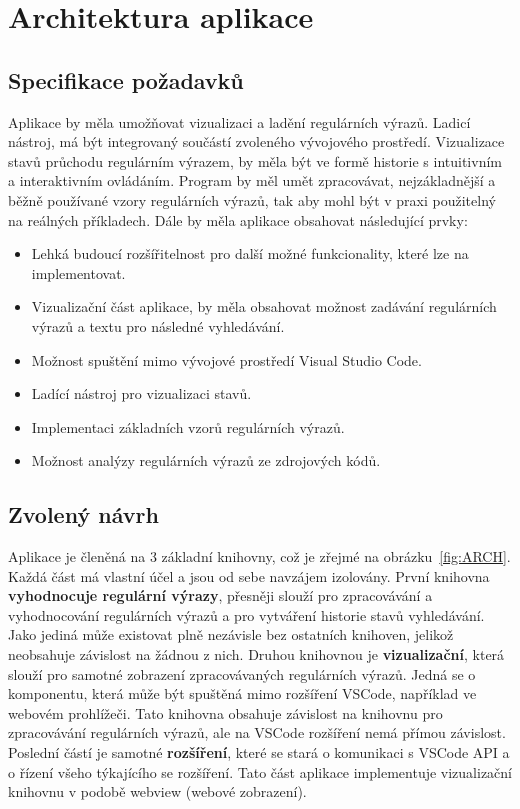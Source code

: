 \chapter{Architektura aplikace}\label{sec:ApplicationTechnology}

\section{Specifikace požadavků}

Aplikace by měla umožňovat vizualizaci a ladění regulárních výrazů.
Ladicí nástroj, má být integrovaný součástí zvoleného vývojového prostředí.
Vizualizace stavů průchodu regulárním výrazem, by měla být ve formě historie s intuitivním a interaktivním ovládáním.
Program by měl umět zpracovávat, nejzákladnější a běžně používané vzory regulárních výrazů, tak aby mohl být v praxi použitelný na reálných příkladech.
Dále by měla aplikace obsahovat následující prvky:
\begin{itemize}
	\item Lehká budoucí rozšířitelnost pro další možné funkcionality, které lze na implementovat.
	\item Vizualizační část aplikace, by měla obsahovat možnost zadávání regulárních výrazů a textu pro následné vyhledávání.
	\item Možnost spuštění mimo vývojové prostředí Visual Studio Code.
	\item Ladící nástroj pro vizualizaci stavů.
	\item Implementaci základních vzorů regulárních výrazů.
	\item Možnost analýzy regulárních výrazů ze zdrojových kódů.
\end{itemize}

\section{Zvolený návrh}

Aplikace je členěná na 3 základní knihovny, což je zřejmé na obrázku~\ref{fig:ARCH}.
Každá část má vlastní účel a jsou od sebe navzájem izolovány.
První knihovna \textbf{vyhodnocuje regulární výrazy}, přesněji slouží pro zpracovávání a vyhodnocování regulárních výrazů a pro vytváření historie stavů vyhledávání.
Jako jediná může existovat plně nezávisle bez ostatních knihoven, jelikož neobsahuje závislost na žádnou z nich.
Druhou knihovnou je \textbf{vizualizační}, která slouží pro samotné zobrazení zpracovávaných regulárních výrazů.
Jedná se o komponentu, která může být spuštěná mimo rozšíření VSCode, například ve webovém prohlížeči.
Tato knihovna obsahuje závislost na knihovnu pro zpracovávání regulárních výrazů, ale na VSCode rozšíření nemá přímou závislost.
Poslední částí je samotné \textbf{rozšíření}, které se stará o komunikaci s VSCode API a o řízení všeho týkajícího se rozšíření.
Tato část aplikace implementuje vizualizační knihovnu v podobě webview (webové zobrazení).

